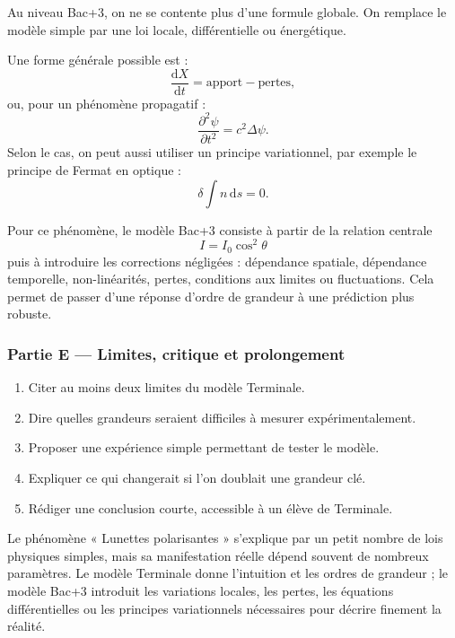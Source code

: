 \documentclass[11pt,a4paper]{article}
\begin{document}
\begin{approfondissementbox}
Au niveau Bac+3, on ne se contente plus d'une formule globale. On remplace le modèle simple par une loi locale, différentielle ou énergétique.

Une forme générale possible est :
\[
\frac{\mathrm d X}{\mathrm dt}=\text{apport}-\text{pertes},
\]
ou, pour un phénomène propagatif :
\[
\frac{\partial^2 \psi}{\partial t^2}=c^2\Delta\psi.
\]
Selon le cas, on peut aussi utiliser un principe variationnel, par exemple le principe de Fermat en optique :
\[
\delta \int n\,\mathrm ds=0.
\]

Pour ce phénomène, le modèle Bac+3 consiste à partir de la relation centrale
\[
I=I_0\cos^2\theta
\]
puis à introduire les corrections négligées : dépendance spatiale, dépendance temporelle, non-linéarités, pertes, conditions aux limites ou fluctuations. Cela permet de passer d'une réponse d'ordre de grandeur à une prédiction plus robuste.
\end{approfondissementbox}

\subsubsection*{Partie E — Limites, critique et prolongement}

\begin{enumerate}
  \item Citer au moins deux limites du modèle Terminale.
  \item Dire quelles grandeurs seraient difficiles à mesurer expérimentalement.
  \item Proposer une expérience simple permettant de tester le modèle.
  \item Expliquer ce qui changerait si l'on doublait une grandeur clé.
  \item Rédiger une conclusion courte, accessible à un élève de Terminale.
\end{enumerate}

\begin{corrigebox}
Le phénomène « Lunettes polarisantes » s'explique par un petit nombre de lois physiques simples, mais sa manifestation réelle dépend souvent de nombreux paramètres. Le modèle Terminale donne l'intuition et les ordres de grandeur ; le modèle Bac+3 introduit les variations locales, les pertes, les équations différentielles ou les principes variationnels nécessaires pour décrire finement la réalité.
\end{corrigebox}
\end{document}
